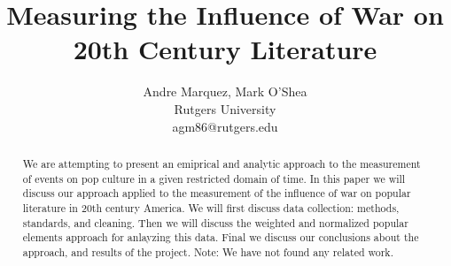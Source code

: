 \documentclass[twoside]{article}
\title{\vspace{-15mm}%
	\fontsize{24pt}{10pt}\selectfont
	\textbf{Measuring the Influence of War on 20th Century Literature}
	}
\author{
    Andre Marquez, Mark O'Shea\\
    Rutgers University\\
    agm86@rutgers.edu
}
\date{}
\begin{document}
\maketitle
    \thispagestyle{fancy}

\begin{abstract}
\noindent 
We are attempting to present an emiprical and analytic approach to the measurement of events on pop culture in a given restricted domain of time. In this paper we will discuss our approach applied to the measurement of the influence of war on popular literature in 20th century America. We will first discuss data collection: methods, standards, and cleaning. Then we will discuss the weighted and normalized popular elements approach for anlayzing this data. Final we discuss our conclusions about the approach, and results of the project. Note: We have not found any related work.
\end{abstract}
\smallskip
	
\end{document}
